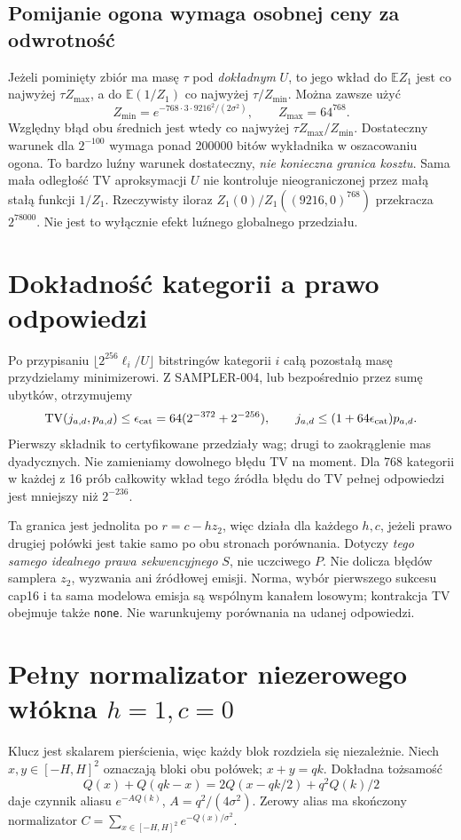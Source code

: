 \documentclass[11pt,a4paper]{article}
\newcommand{\code}[1]{\nolinkurl{#1}}
\newcommand{\E}{\mathbb E}
\newcommand{\TV}{\operatorname{TV}}
\begin{document}
\subsection*{Pomijanie ogona wymaga osobnej ceny za odwrotność}
Jeżeli pominięty zbiór ma masę $\tau$ pod \emph{dokładnym} $U$, to
jego wkład do $\E Z_1$ jest co najwyżej $\tau Z_{\max}$, a do
$\E(1/Z_1)$ co najwyżej $\tau/Z_{\min}$. Można zawsze użyć
\[
 Z_{\min}=e^{-768\cdot3\cdot9216^2/(2\sigma^2)},\qquad
 Z_{\max}=64^{768}.
\]
Względny błąd obu średnich jest wtedy co najwyżej
$\tau Z_{\max}/Z_{\min}$. Dostateczny warunek dla $2^{-100}$
wymaga ponad 200000 bitów wykładnika w oszacowaniu ogona.
To bardzo luźny warunek dostateczny, \emph{nie konieczna granica kosztu}.
Sama mała odległość TV aproksymacji $U$ nie kontroluje nieograniczonej
przez małą stałą funkcji $1/Z_1$.
Rzeczywisty iloraz $Z_1(0)/Z_1((9216,0)^{768})$ przekracza $2^{78000}$.
Nie jest to wyłącznie efekt luźnego globalnego przedziału.

\section{Dokładność kategorii a prawo odpowiedzi}
Po przypisaniu $\lfloor 2^{256}\ell_i/U\rfloor$ bitstringów kategorii $i$
całą pozostałą masę przydzielamy minimizerowi. Z SAMPLER-004, lub bezpośrednio
przez sumę ubytków, otrzymujemy
\[
 \TV(j_{a,d},p_{a,d})\le\epsilon_{\rm cat}
 =64(2^{-372}+2^{-256}),\qquad
 j_{a,d}\le(1+64\epsilon_{\rm cat})p_{a,d}.
\]
Pierwszy składnik to certyfikowane przedziały wag; drugi to zaokrąglenie
mas dyadycznych. Nie zamieniamy dowolnego błędu TV na moment.
Dla 768 kategorii w każdej z 16 prób całkowity wkład tego źródła błędu
do TV pełnej odpowiedzi jest mniejszy niż $2^{-236}$.

Ta granica jest jednolita po $r=c-hz_2$, więc działa dla każdego $h,c$,
jeżeli prawo drugiej połówki jest takie samo po obu stronach porównania.
Dotyczy \emph{tego samego idealnego prawa sekwencyjnego} $S$, nie uczciwego $P$.
Nie dolicza błędów samplera $z_2$, wyzwania ani źródłowej emisji.
Norma, wybór pierwszego sukcesu cap16 i ta sama modelowa emisja są wspólnym
kanałem losowym; kontrakcja TV obejmuje także \code{none}.
Nie warunkujemy porównania na udanej odpowiedzi.

\section{Pełny normalizator niezerowego włókna \texorpdfstring{$h=1,c=0$}{h=1,c=0}}
Klucz jest skalarem pierścienia, więc każdy blok rozdziela się niezależnie.
Niech $x,y\in[-H,H]^2$ oznaczają bloki obu połówek; $x+y=qk$.
Dokładna tożsamość
\[
 Q(x)+Q(qk-x)=2Q(x-qk/2)+q^2Q(k)/2
\]
daje czynnik aliasu $e^{-A Q(k)}$, $A=q^2/(4\sigma^2)$.
Zerowy alias ma skończony normalizator
$C=\sum_{x\in[-H,H]^2}e^{-Q(x)/\sigma^2}$.
\end{document}
